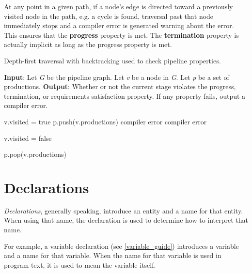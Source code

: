 At any point in a given path, if a node's edge is directed toward a previously visited node in the path, e.g. a cycle is found, traversal past that node immediately stops and a compiler error is generated warning about the error. This ensures that the \textbf{progress} property is met. The \textbf{termination} property is actually implicit as long as the progress property is met.

\begin{algorithm}
 \caption{Depth-first traversal with backtracking used to check pipeline properties.}
 \label{alg:dfs}
 \begin{algorithmic}
 \State
 \State \textbf{Input}: Let \textit{G} be the pipeline graph. Let \textit{v} be a node in \textit{G}. Let \textit{p} be a set of productions.
 \State \textbf{Output}: Whether or not the current stage violates the progress, termination, or requirements satisfaction property. If any property fails, output a compiler error.
 \State

 	\State v.visited = true
 	\State p.push(v.productions)
 				\State {}
 			\Else
 				\State \Return compiler error
 			\EndIf
 		\EndFor
	\Else
 		\State \Return compiler error
 	\EndIf

 	\State v.visited = false 

 	\State p.pop(v.productions) 
 \EndFunction
 \end{algorithmic}

\end{algorithm}

\section{Declarations} \label{declaration_guide}

\textit{Declarations}, generally speaking, introduce an entity and a name for that entity. When using that name, the declaration is used to determine how to interpret that name.

For example, a variable declaration (see \ref{variable_guide}) introduces a variable and a name for that variable. When the name for that variable is used in program text, it is used to mean the variable itself.

